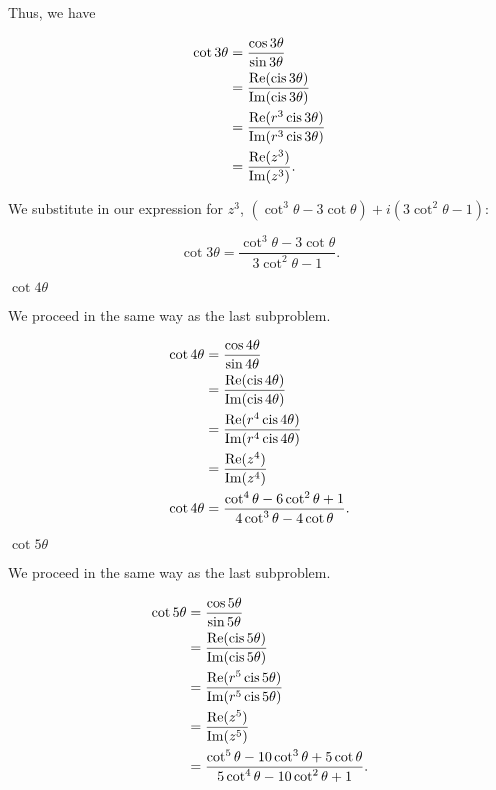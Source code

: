\documentclass[../key.tex]{subfiles}
\begin{document}
Thus, we have

\begin{align*}
\cot 3\theta &= \frac{\cos 3\theta}{\sin 3\theta} \\
&= \frac{\operatorname{Re}(\operatorname{cis} 3\theta)}{\operatorname{Im}(\operatorname{cis} 3\theta)} \\
&= \frac{\operatorname{Re}(r^3\operatorname{cis} 3\theta)}{\operatorname{Im}(r^3\operatorname{cis} 3\theta)} \\
&= \frac{\operatorname{Re}(z^3)}{\operatorname{Im}(z^3)}.
\end{align*}

We substitute in our expression for $z^3$, $(\cot^3\theta - 3\cot\theta) + i(3\cot^2\theta - 1)$:

$$\cot 3\theta = \frac{\cot^3\theta - 3\cot\theta}{3\cot^2\theta - 1}.$$

\begin{iinner_problem}[start=1]
\item $\cot 4\theta$
\end{iinner_problem}

We proceed in the same way as the last subproblem.

\begin{align*}
\cot 4\theta &= \frac{\cos 4\theta}{\sin 4\theta} \\ 
&= \frac{\operatorname{Re}(\operatorname{cis} 4\theta)}{\operatorname{Im}(\operatorname{cis} 4\theta)} \\
&= \frac{\operatorname{Re}(r^4\operatorname{cis} 4\theta)}{\operatorname{Im}(r^4\operatorname{cis} 4\theta)} \\
&= \frac{\operatorname{Re}(z^4)}{\operatorname{Im}(z^4)} \\
\cot 4\theta &= \frac{\cot^4\theta - 6\cot^2\theta + 1}{4\cot^3 \theta - 4\cot\theta}. \\
\end{align*}

\begin{iinner_problem}[start=1]
\item $\cot 5\theta$
\end{iinner_problem}

We proceed in the same way as the last subproblem.

\begin{align*}
\cot 5\theta &= \frac{\cos 5\theta}{\sin 5\theta}  \\
&= \frac{\operatorname{Re}(\operatorname{cis} 5\theta)}{\operatorname{Im}(\operatorname{cis} 5\theta)} \\
&= \frac{\operatorname{Re}(r^5\operatorname{cis} 5\theta)}{\operatorname{Im}(r^5\operatorname{cis} 5\theta)} \\
&= \frac{\operatorname{Re}(z^5)}{\operatorname{Im}(z^5)} \\
&= \frac{\cot^5\theta - 10\cot^3\theta + 5\cot\theta}{5\cot^4\theta - 10\cot^2\theta + 1}.
\end{align*}
\end{document}
